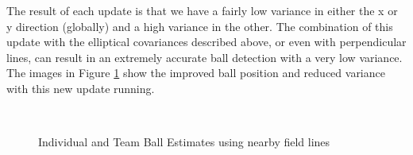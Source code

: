\documentclass[runningheads,a4paper]{llncs}
\begin{document}
The result of each update is that we have a fairly low variance in either the x or y direction (globally) and a high variance in the other. The combination of this update with the elliptical covariances described above, or even with perpendicular lines, can result in an extremely accurate ball detection with a very low variance. The images in Figure \ref{fig:flellipses} show the improved ball position and reduced variance with this new update running.

\begin{figure}[h!]
  \centering
  \\
  \caption{Individual and Team Ball Estimates using nearby field lines\label{fieldlines}}
  \label{fig:flellipses}
\end{figure}
\end{document}
